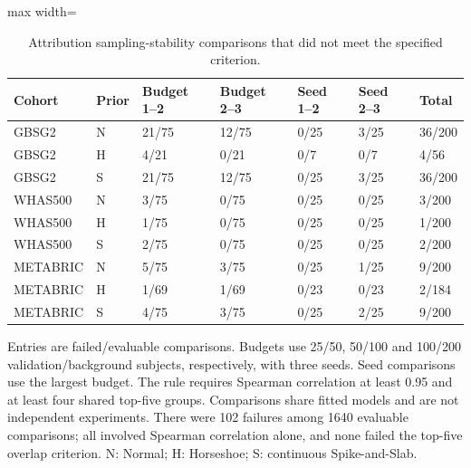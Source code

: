 \begin{table}[htbp]
\centering
\begingroup\singlespacing\footnotesize
\setlength{\tabcolsep}{3pt}
\caption{Attribution sampling-stability comparisons that did not meet the specified criterion.}\label{tab:exam-attribution-failures}
\begin{adjustbox}{max width=\textwidth}
\begin{tabular}{@{}lllllll@{}}
\toprule Cohort & Prior & Budget 1--2 & Budget 2--3 & Seed 1--2 & Seed 2--3 & Total\\\midrule
GBSG2 & N & 21/75 & 12/75 & 0/25 & 3/25 & 36/200\\
GBSG2 & H & 4/21 & 0/21 & 0/7 & 0/7 & 4/56\\
GBSG2 & S & 21/75 & 12/75 & 0/25 & 3/25 & 36/200\\
WHAS500 & N & 3/75 & 0/75 & 0/25 & 0/25 & 3/200\\
WHAS500 & H & 1/75 & 0/75 & 0/25 & 0/25 & 1/200\\
WHAS500 & S & 2/75 & 0/75 & 0/25 & 0/25 & 2/200\\
METABRIC & N & 5/75 & 3/75 & 0/25 & 1/25 & 9/200\\
METABRIC & H & 1/69 & 1/69 & 0/23 & 0/23 & 2/184\\
METABRIC & S & 4/75 & 3/75 & 0/25 & 2/25 & 9/200\\
\bottomrule
\end{tabular}
\end{adjustbox}
\par\smallskip
\begin{minipage}{\textwidth}
Entries are failed/evaluable comparisons. Budgets use 25/50, 50/100 and 100/200 validation/background subjects, respectively, with three seeds. Seed comparisons use the largest budget. The rule requires Spearman correlation at least 0.95 and at least four shared top-five groups. Comparisons share fitted models and are not independent experiments. There were 102 failures among 1640 evaluable comparisons; all involved Spearman correlation alone, and none failed the top-five overlap criterion. N: Normal; H: Horseshoe; S: continuous Spike-and-Slab.
\end{minipage}
\endgroup
\end{table}
